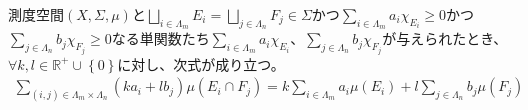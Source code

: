 \documentclass[dvipdfmx]{jsarticle}
\begin{document}
\begin{thm}\label{4.6.1.2}
測度空間$(X,\varSigma,\mu)$と$\bigsqcup_{i \in \varLambda_{m}} E_{i} = \bigsqcup_{j \in \varLambda_{n}} F_{j} \in \varSigma$かつ$\sum_{i \in \varLambda_{m}} {a_{i}\chi_{E_{i}}} \geq 0$かつ$\sum_{j \in \varLambda_{n}} {b_{j}\chi_{F_{j}}} \geq 0$なる単関数たち$\sum_{i \in \varLambda_{m}} {a_{i}\chi_{E_{i}}}$、$\sum_{j \in \varLambda_{n}} {b_{j}\chi_{F_{j}}}$が与えられたとき、$\forall k,l \in \mathbb{R}^{+} \cup \left\{ 0 \right\}$に対し、次式が成り立つ。
\begin{align*}
\sum_{(i,j) \in \varLambda_{m} \times \varLambda_{n}} {\left( ka_{i} + lb_{j} \right)\mu\left( E_{i} \cap F_{j} \right)} = k\sum_{i \in \varLambda_{m}} {a_{i}\mu\left( E_{i} \right)} + l\sum_{j \in \varLambda_{n}} {b_{j}\mu\left( F_{j} \right)}
\end{align*}
\end{thm}
\end{document}
